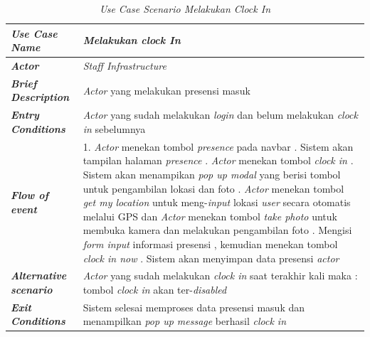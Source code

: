 \FloatBarrier
\begin{longtable}{ |p{6cm}|p{8cm}|}
\caption{\textit{Use Case Scenario Melakukan Clock In}}\label{tab:use-case-scenario-clock-in} 
\\
\hline
\textbf{\textit{Use Case Name}}
&\textit{Melakukan clock In}
\\ \hline

\textbf{\textit{Actor}}
&\textit{Staff Infrastructure}
\\ \hline

\textbf{\textit{Brief Description}}
&\textit{Actor} yang melakukan presensi masuk
\\ \hline

\textbf{\textit{Entry Conditions}}
&\textit{Actor} yang sudah melakukan \textit{login} dan belum melakukan \textit{clock in} sebelumnya
\\ \hline

\textbf{\textit{Flow of event}}
&1. \textit{Actor} menekan tombol \textit{presence} pada navbar
\newline
2. Sistem akan tampilan halaman \textit{presence}
\newline
3. \textit{Actor} menekan tombol \textit{clock in}
\newline
4. Sistem akan menampikan \textit{pop up modal} yang berisi tombol untuk pengambilan lokasi dan foto
\newline
5. \textit{Actor} menekan tombol \textit{get my location} untuk meng-\textit{input} lokasi \textit{user} secara otomatis melalui GPS dan \textit{Actor} menekan tombol \textit{take photo} untuk membuka kamera dan melakukan pengambilan foto
\newline
6. Mengisi \textit{form input} informasi presensi , kemudian menekan tombol \textit{clock in now}
\newline
7. Sistem akan menyimpan data presensi \textit{actor}
\\ \hline

\textbf{\textit{Alternative scenario}}
&\textit{Actor} yang sudah melakukan \textit{clock in} saat terakhir kali maka : tombol \textit{clock in} akan ter-\textit{disabled}
\\ \hline

\textbf{\textit{Exit Conditions}}
&Sistem selesai memproses data presensi masuk dan menampilkan \textit{pop up message} berhasil \textit{clock in}
\\ \hline
\end{longtable}


